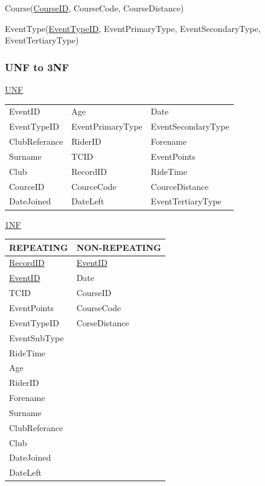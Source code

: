 Course(\underline{CourseID}, CourseCode, CourseDistance)

EventType(\underline{EventTypeID}, EventPrimaryType, EventSecondaryType, EventTertiaryType)

\subsubsection{UNF to 3NF}
\underline{UNF}


\begin{tabular}{l l l}
EventID       & Age              & Date               \\
EventTypeID   & EventPrimaryType & EventSecondaryType \\
ClubReferance & RiderID          & Forename           \\
Surname       & TCID             & EventPoints        \\
Club          & RecordID         & RideTime           \\
CourceID      & CourceCode       & CourceDistance     \\
DateJoined    & DateLeft         & EventTertiaryType  \\
\end{tabular}

\underline{1NF}

\begin{tabular}{|l|l|}
\hline
REPEATING            & NON-REPEATING       \\ \hline
\underline{RecordID} & \underline{EventID} \\ \hline
\underline{EventID}  & Date                \\ \hline
TCID                 & CourseID            \\ \hline
EventPoints          & CourseCode          \\ \hline
EventTypeID          & CorseDistance       \\ \hline 
EventSubType         &                     \\ \hline 
RideTime             &                     \\ \hline 
Age                  &                     \\ \hline
RiderID              &                     \\ \hline
Forename             &                     \\ \hline
Surname              &                     \\ \hline
ClubReferance        &                     \\ \hline
Club                 &                     \\ \hline
DateJoined           &                     \\ \hline
DateLeft             &                     \\ \hline
\end{tabular}




